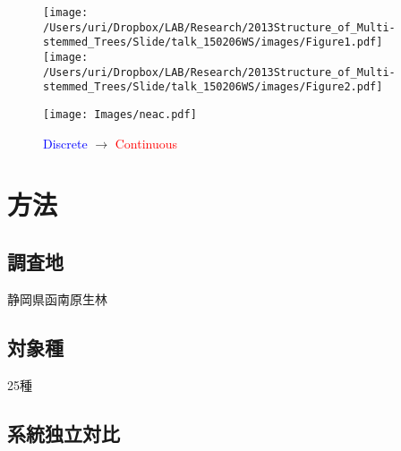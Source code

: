 \documentclass[a0, 36pt, plainboxedsections]{sciposter} %
\begin{document}
\begin{figure}
	\begin{center}
		\texttt{[image: /Users/uri/Dropbox/LAB/Research/2013Structure\_of\_Multi-stemmed\_Trees/Slide/talk\_150206WS/images/Figure1.pdf]}
		\texttt{[image: /Users/uri/Dropbox/LAB/Research/2013Structure\_of\_Multi-stemmed\_Trees/Slide/talk\_150206WS/images/Figure2.pdf]}
	\end{center}
\end{figure}

\begin{figure}[H]
  \begin{center}
	\texttt{[image: Images/neac.pdf]}
	{\small\caption{{\textcolor{blue}{Discrete}} $\rightarrow$ {\textcolor{red}{Continuous}}}}
  \end{center}
\end{figure}

\section*{\huge{方法}}

\begin{multicols}{3}

\subsection*{調査地}

静岡県函南原生林

\subsection*{対象種}

25種

\subsection*{系統独立対比}


\end{multicols}


\end{document}
